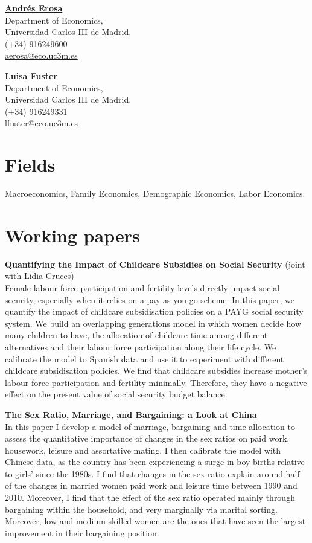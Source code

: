 \documentclass[margin]{res} %
\begin{document}
\begin{resume}
\begin{multicols}{2}
	\href{http://economics.uc3m.es/personal/andres-erosa/}{\bf{Andr\'es Erosa}}  \\
	Department of Economics, \\
	Universidad Carlos III de Madrid, \\
	(+34) 916249600 \\
	\href{mailto:aerosa@eco.uc3m.es}{aerosa@eco.uc3m.es}
	
	\columnbreak
	
	\href{http://economics.uc3m.es/personal/luisa-fuster/}{\bf{Luisa Fuster}} \\
	Department of Economics, \\
	Universidad Carlos III de Madrid, \\
	(+34) 916249331 \\
	\href{mailto:lfuster@eco.uc3m.es}{lfuster@eco.uc3m.es}
	
\end{multicols}

\section{Fields}

Macroeconomics, Family Economics, Demographic Economics, Labor Economics.

\section{Working papers}
{\bf Quantifying the Impact of Childcare Subsidies on Social Security} (joint with Lidia Cruces) \\
Female labour force participation and fertility levels directly impact social security, especially when it relies on a pay-as-you-go scheme. In this paper, we quantify the impact of childcare subsidisation policies on a PAYG social security system. We build an overlapping generations model in which women decide how many children to have, the allocation of childcare time among different alternatives and their labour force participation along their life cycle. We calibrate the model to Spanish data and use it to experiment with different childcare subsidisation policies. We find that childcare subsidies increase mother's labour force participation and fertility minimally. Therefore, they have a negative effect on the present value of social security budget balance. 

{\bf The Sex Ratio, Marriage, and Bargaining: a Look at China} \\
In this paper I develop a model of marriage, bargaining and time allocation to assess the quantitative importance of changes in the sex ratios on paid work, housework, leisure and assortative mating. I then calibrate the model with Chinese data, as the country has been experiencing a surge in boy births relative to girls' since the 1980s. I find that changes in the sex ratio explain around half of the changes in married women paid work and leisure time between 1990 and 2010. Moreover, I find that the effect of the sex ratio operated mainly through bargaining within the household, and very marginally via marital sorting. Moreover, low and medium skilled women are the ones that have seen the largest improvement in their bargaining position.

\end{resume}
\end{document}
